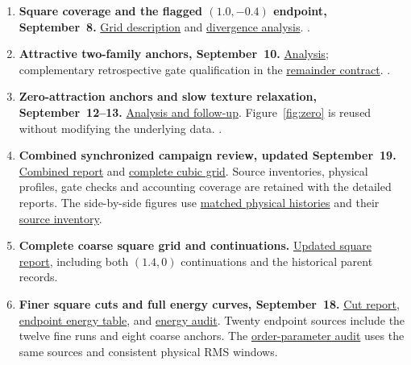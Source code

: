 \documentclass[11pt,letterpaper]{article}
\begin{document}
\begin{enumerate}
 \item\label{ev:grid}
 \textbf{Square coverage and the flagged $(1.0,-0.4)$ endpoint, September~8.}
 \href{run:../reports/square_grid_20260908/README.md}{Grid description} and
 \href{run:../reports/square_grid_20260908/ANALYSIS.md}{divergence analysis}.
 .

 \item\label{ev:attractive}
 \textbf{Attractive two-family anchors, September~10.}
 \href{run:../reports/two_basin_vm04_20260910/README.md}{Analysis};
 complementary retrospective gate qualification in the
 \href{run:../reports/two_basin_remainder_20260910/README.md}{remainder contract}.
 .

 \item\label{ev:zero}
 \textbf{Zero-attraction anchors and slow texture relaxation, September~12--13.}
 \href{run:../reports/two_basin_v000_20260912/README.md}{Analysis and follow-up}.
 Figure~\ref{fig:zero} is reused without modifying the underlying data.
 .

 \item\label{ev:campaign}
 \textbf{Combined synchronized campaign review, updated September~19.}
 \href{run:../reports/campaign_review_20260918/README.md}{Combined report} and
 \href{run:../reports/cubic_two_basin_grid_20260918/README.md}{complete cubic grid}.
 Source inventories, physical profiles, gate checks and accounting coverage
 are retained with the detailed reports.
 The side-by-side figures use
 \href{run:../reports/campaign_review_20260918/square_cubic_histories.csv}{matched physical histories}
 and their \href{run:../reports/campaign_review_20260918/square_cubic_comparison_sources.json}{source inventory}.

 \item\label{ev:square-complete}
 \textbf{Complete coarse square grid and continuations.}
 \href{run:../reports/two_basin_grid_20260915/README.md}{Updated square report},
 including both $(1.4,0)$ continuations and the historical parent records.

 \item\label{ev:fine-cuts}
 \textbf{Finer square cuts and full energy curves, September~18.}
 \href{run:../reports/square_fine_cuts_20260918/README.md}{Cut report},
 \href{run:../reports/square_fine_cuts_20260918/variational_energy_cuts.csv}{endpoint energy table},
 and \href{run:../reports/square_fine_cuts_20260918/variational_energy_analysis.json}{energy audit}.
 Twenty endpoint sources include the twelve fine runs and eight coarse anchors.
 The \href{run:../reports/square_fine_cuts_20260918/order_parameter_analysis.json}{order-parameter audit}
 uses the same sources and consistent physical RMS windows.


\end{enumerate}
\end{document}
